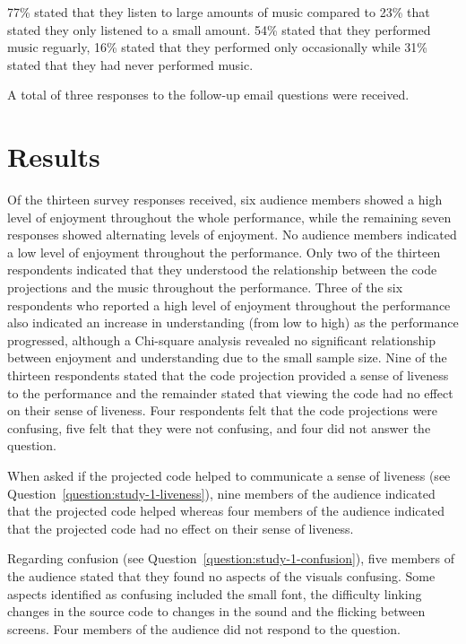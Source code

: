 77\% stated that they listen to large amounts of music compared to 23\% that stated they only listened to a small amount. 54\% stated that they performed music reguarly, 16\% stated that they performed only occasionally while 31\% stated that they had never performed music.

A total of three responses to the follow-up email questions were received.

\section{Results}

Of the thirteen survey responses received, six audience members showed a high level of enjoyment throughout the whole performance, while the remaining seven responses showed alternating levels of enjoyment. No audience members indicated a low level of enjoyment throughout the performance.  Only two of the thirteen respondents indicated that they understood the relationship between the code projections and the music throughout the performance. Three of the six respondents who reported a high level of enjoyment throughout the performance also indicated an increase in understanding (from low to high) as the performance progressed, although a Chi-square analysis revealed no significant relationship between enjoyment and understanding due to the small sample size. Nine of the thirteen respondents stated that the code projection provided a sense of liveness to the performance and the remainder stated that viewing the code had no effect on their sense of liveness. Four respondents felt that the code projections were confusing, five felt that they were not confusing, and four did not answer the question.


When asked if the projected code helped to communicate a sense of liveness (see Question~\ref{question:study-1-liveness}), nine members of the audience indicated that the projected code helped whereas four members of the audience indicated that the projected code had no effect on their sense of liveness.

Regarding confusion (see Question~\ref{question:study-1-confusion}), five members of the audience stated that they found no aspects of the visuals confusing. Some aspects identified as confusing included the small font, the difficulty linking changes in the source code to changes in the sound and the flicking between screens. Four members of the audience did not respond to the question.

